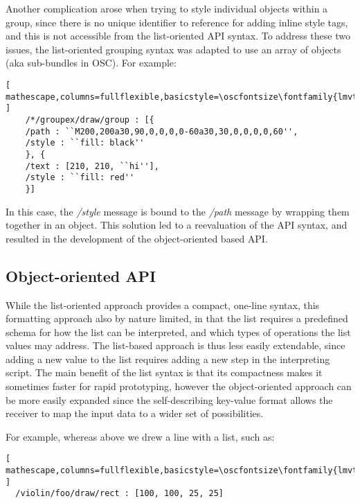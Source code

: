 Another complication arose when trying to style individual objects within a group, since there is no unique identifier to reference for adding inline style tags, and this is not accessible from the list-oriented API syntax. 
To address these two issues, the list-oriented grouping syntax was adapted to use an array of objects (aka sub-bundles in OSC). For example:
 
\begin{lstlisting}[ mathescape,columns=fullflexible,basicstyle=\oscfontsize\fontfamily{lmvtt}\selectfont ]
    /*/groupex/draw/group : [{
	/path : ``M200,200a30,90,0,0,0,0-60a30,30,0,0,0,0,60'',
	/style : ``fill: black''
    }, {
	/text : [210, 210, ``hi''],
	/style : ``fill: red''
    }]
\end{lstlisting}

\noindent
In this case, the \textit{/style} message is bound to the \textit{/path} message by wrapping them together in an object. 
This solution led to a reevaluation of the \drawsocket API syntax, and resulted in the development of the object-oriented based API.

\subsection{Object-oriented API}\label{sec:objstyle}
While the list-oriented approach provides a compact, one-line syntax, this formatting approach also by nature limited, in that the list requires a predefined schema for how the list can be interpreted, and which types of operations the list values may address. 
The list-based approach is thus less easily extendable, since adding a new value to the list requires adding a new step in the interpreting script.
The main benefit of the list syntax is that its compactness makes it sometimes faster for rapid prototyping, however the object-oriented approach can be more easily expanded since the self-describing key-value format allows the receiver to map the input data to a wider set of possibilities.


For example, whereas above we drew a line with a list, such as:
\begin{lstlisting}[ mathescape,columns=fullflexible,basicstyle=\oscfontsize\fontfamily{lmvtt}\selectfont ]
  /violin/foo/draw/rect : [100, 100, 25, 25]
\end{lstlisting}

